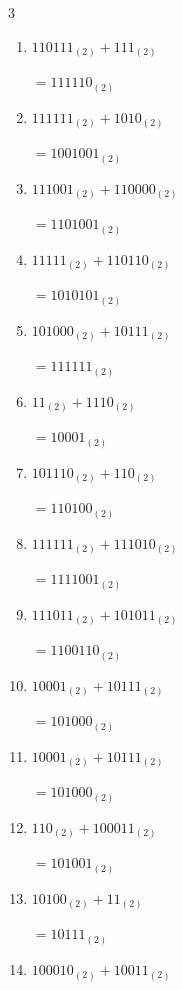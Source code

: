 \begin{multicols}{3}
\begin{enumerate}
        $=1011011_{(2)}$

  \item $110111_{(2)} + 111_{(2)}$

        $=111110_{(2)}$

  \item $111111_{(2)} + 1010_{(2)}$

        $=1001001_{(2)}$

  \item $111001_{(2)} + 110000_{(2)}$

        $=1101001_{(2)}$

  \item $11111_{(2)} + 110110_{(2)}$

        $=1010101_{(2)}$

  \item $101000_{(2)} + 10111_{(2)}$

        $=111111_{(2)}$

  \item $11_{(2)} + 1110_{(2)}$

        $=10001_{(2)}$

  \item $101110_{(2)} + 110_{(2)}$

        $=110100_{(2)}$

  \item $111111_{(2)} + 111010_{(2)}$

        $=1111001_{(2)}$

  \item $111011_{(2)} + 101011_{(2)}$

        $=1100110_{(2)}$

\columnbreak %

  \item $10001_{(2)} + 10111_{(2)}$

        $=101000_{(2)}$

  \item $10001_{(2)} + 10111_{(2)}$

        $=101000_{(2)}$

  \item $110_{(2)} + 100011_{(2)}$

        $=101001_{(2)}$

  \item $10100_{(2)} + 11_{(2)}$

        $=10111_{(2)}$

  \item $100010_{(2)} + 10011_{(2)}$


\end{enumerate}
\end{multicols}
